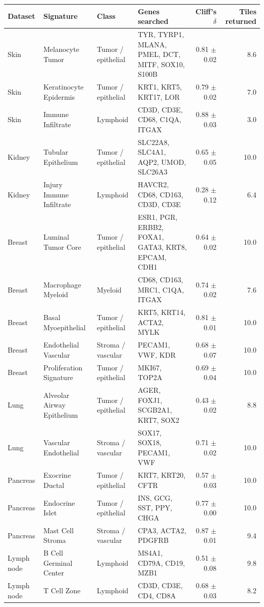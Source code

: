 \begin{tabular}{lll>{\raggedright\arraybackslash}p{5.2cm}rr}
\toprule
Dataset & Signature & Class & Genes searched & Cliff's $\delta$ & Tiles returned \\
\midrule
Skin & Melanocyte Tumor & Tumor / epithelial & TYR, TYRP1, MLANA, PMEL, DCT, MITF, SOX10, S100B & 0.81 $\pm$ 0.02 & 8.6 \\
Skin & Keratinocyte Epidermis & Tumor / epithelial & KRT1, KRT5, KRT17, LOR & 0.79 $\pm$ 0.02 & 7.0 \\
Skin & Immune Infiltrate & Lymphoid & CD3D, CD3E, CD68, C1QA, ITGAX & 0.88 $\pm$ 0.03 & 3.0 \\
Kidney & Tubular Epithelium & Tumor / epithelial & SLC22A8, SLC4A1, AQP2, UMOD, SLC26A3 & 0.65 $\pm$ 0.05 & 10.0 \\
Kidney & Injury Immune Infiltrate & Lymphoid & HAVCR2, CD68, CD163, CD3D, CD3E & 0.28 $\pm$ 0.12 & 6.4 \\
Breast & Luminal Tumor Core & Tumor / epithelial & ESR1, PGR, ERBB2, FOXA1, GATA3, KRT8, EPCAM, CDH1 & 0.64 $\pm$ 0.02 & 10.0 \\
Breast & Macrophage Myeloid & Myeloid & CD68, CD163, MRC1, C1QA, ITGAX & 0.74 $\pm$ 0.02 & 7.6 \\
Breast & Basal Myoepithelial & Tumor / epithelial & KRT5, KRT14, ACTA2, MYLK & 0.81 $\pm$ 0.01 & 10.0 \\
Breast & Endothelial Vascular & Stroma / vascular & PECAM1, VWF, KDR & 0.68 $\pm$ 0.07 & 10.0 \\
Breast & Proliferation Signature & Tumor / epithelial & MKI67, TOP2A & 0.69 $\pm$ 0.04 & 10.0 \\
Lung & Alveolar Airway Epithelium & Tumor / epithelial & AGER, FOXJ1, SCGB2A1, KRT7, SOX2 & 0.43 $\pm$ 0.02 & 8.8 \\
Lung & Vascular Endothelial & Stroma / vascular & SOX17, SOX18, PECAM1, VWF & 0.71 $\pm$ 0.02 & 10.0 \\
Pancreas & Exocrine Ductal & Tumor / epithelial & KRT7, KRT20, CFTR & 0.57 $\pm$ 0.03 & 10.0 \\
Pancreas & Endocrine Islet & Tumor / epithelial & INS, GCG, SST, PPY, CHGA & 0.77 $\pm$ 0.00 & 10.0 \\
Pancreas & Mast Cell Stroma & Stroma / vascular & CPA3, ACTA2, PDGFRB & 0.87 $\pm$ 0.01 & 9.4 \\
Lymph node & B Cell Germinal Center & Lymphoid & MS4A1, CD79A, CD19, MZB1 & 0.51 $\pm$ 0.08 & 9.8 \\
Lymph node & T Cell Zone & Lymphoid & CD3D, CD3E, CD4, CD8A & 0.68 $\pm$ 0.03 & 8.2 \\

\end{tabular}
